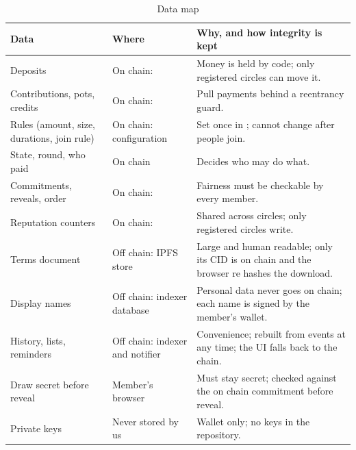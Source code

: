 \begin{table}[H]
\centering\small
\caption{Data map}
\label{tab:datamap}
\begin{tabularx}{\textwidth}{@{}P{3.4cm}P{3.4cm}L@{}}
\toprule
Data & Where & Why, and how integrity is kept \\
\midrule
Deposits & On chain:  & Money is held by code; only registered circles can move it. \\
Contributions, pots, credits & On chain:  & Pull payments behind a reentrancy guard. \\
Rules (amount, size, durations, join rule) & On chain:  configuration & Set once in ; cannot change after people join. \\
State, round, who paid & On chain & Decides who may do what. \\
Commitments, reveals, order & On chain:  & Fairness must be checkable by every member. \\
Reputation counters & On chain:  & Shared across circles; only registered circles write. \\
Terms document & Off chain: IPFS store & Large and human readable; only its CID is on chain and the browser re hashes the download. \\
Display names & Off chain: indexer database & Personal data never goes on chain; each name is signed by the member's wallet. \\
History, lists, reminders & Off chain: indexer and notifier & Convenience; rebuilt from events at any time; the UI falls back to the chain. \\
Draw secret before reveal & Member's browser & Must stay secret; checked against the on chain commitment before reveal. \\
Private keys & Never stored by us & Wallet only; no keys in the repository. \\
\bottomrule
\end{tabularx}
\end{table}
